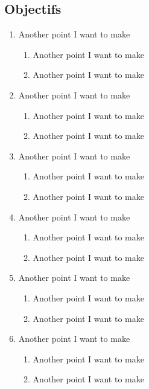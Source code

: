 \subsection{Objectifs}
\setlength{\parindent}{5ex}
\begin{enumerate}
  \item Another point I want to make
        \begin{enumerate}
          \item Another point I want to make
          \item Another point I want to make
        \end{enumerate}
  \item Another point I want to make
        \begin{enumerate}
          \item Another point I want to make
          \item Another point I want to make
        \end{enumerate}
  \item Another point I want to make
        \begin{enumerate}
          \item Another point I want to make
          \item Another point I want to make
        \end{enumerate}
  \item Another point I want to make
        \begin{enumerate}
          \item Another point I want to make
          \item Another point I want to make
        \end{enumerate}
  \item Another point I want to make
        \begin{enumerate}
          \item Another point I want to make
          \item Another point I want to make
        \end{enumerate}
  \item Another point I want to make
        \begin{enumerate}
          \item Another point I want to make
          \item Another point I want to make
        \end{enumerate}
\end{enumerate}\vfill

